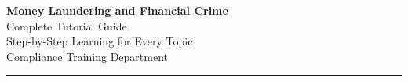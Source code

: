 \documentclass[12pt,aspectratio=169]{beamer}
\begin{document}
\begin{frame}
\centering
\vspace{0.8cm}
{\fontsize{20}{24}\selectfont \textbf{Money Laundering and Financial Crime}}\\[0.2cm]
{\fontsize{15}{18}\selectfont Complete Tutorial Guide}\\[0.4cm]
{\fontsize{12}{14}\selectfont Step-by-Step Learning for Every Topic}\\[0.4cm]
{\fontsize{10}{12}\selectfont Compliance Training Department}
\vspace{0.3cm}
\rule{5cm}{1pt}
\end{frame}

\end{document}
